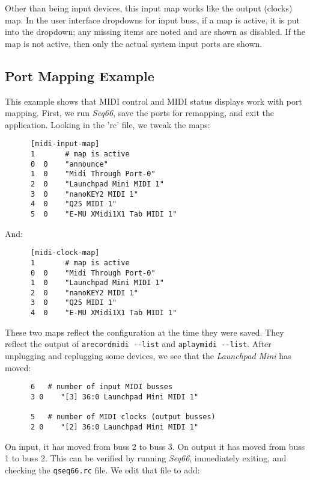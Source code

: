    Other than being input devices, this input map works like the output
   (clocks) map.
   In the user interface dropdowns for input buss, if a map is active, it is
   put into the dropdown; any missing items are noted and are shown as
   disabled.
   If the map is not active, then only the actual system input ports are shown.

\subsection{Port Mapping Example}
\label{subsec:input_port_mapping_example}

   This example shows that MIDI control and MIDI status displays work with
   port mapping.  First, we run \textsl{Seq66}, save the ports for
   remapping, and exit the application.  Looking in the 'rc' file, we tweak
   the maps:

   \begin{verbatim}
      [midi-input-map]
      1       # map is active
      0  0    "announce"
      1  0    "Midi Through Port-0"
      2  0    "Launchpad Mini MIDI 1"
      3  0    "nanoKEY2 MIDI 1"
      4  0    "Q25 MIDI 1"
      5  0    "E-MU XMidi1X1 Tab MIDI 1"
   \end{verbatim}

   And:

   \begin{verbatim}
      [midi-clock-map]
      1       # map is active
      0  0    "Midi Through Port-0"
      1  0    "Launchpad Mini MIDI 1"
      2  0    "nanoKEY2 MIDI 1"
      3  0    "Q25 MIDI 1"
      4  0    "E-MU XMidi1X1 Tab MIDI 1"
   \end{verbatim}

   These two maps reflect the configuration at the time they were saved.
   They reflect the output of \texttt{arecordmidi -{}-list} and
   \texttt{aplaymidi -{}-list}.
   After unplugging and replugging some devices, we see that the
   \textsl{Launchpad Mini} has moved:

   \begin{verbatim}
      6   # number of input MIDI busses
      3 0    "[3] 36:0 Launchpad Mini MIDI 1"

      5   # number of MIDI clocks (output busses)
      2 0    "[2] 36:0 Launchpad Mini MIDI 1"
   \end{verbatim}

   On input, it has moved from buss 2 to buss 3.
   On output it has moved from buss 1 to buss 2.
   This can be verified by running \textsl{Seq66}, immediately exiting,
   and checking the \texttt{qseq66.rc} file.
   We edit that file to add:

